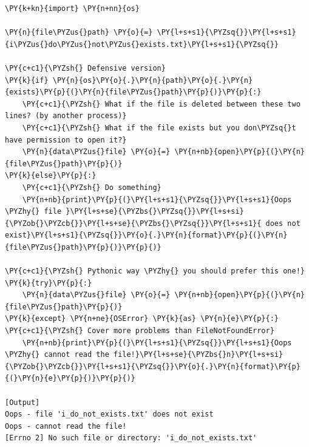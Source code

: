 \begin{Verbatim}[label=\makebox{\url{https://github.com/lucabaldini/cmepda/tree/master/slides/latex/snippets/dont\_ask\_permission.py}},commandchars=\\\{\}]
\PY{k+kn}{import} \PY{n+nn}{os}

\PY{n}{file\PYZus{}path} \PY{o}{=} \PY{l+s+s1}{\PYZsq{}}\PY{l+s+s1}{i\PYZus{}do\PYZus{}not\PYZus{}exists.txt}\PY{l+s+s1}{\PYZsq{}}

\PY{c+c1}{\PYZsh{} Defensive version}
\PY{k}{if} \PY{n}{os}\PY{o}{.}\PY{n}{path}\PY{o}{.}\PY{n}{exists}\PY{p}{(}\PY{n}{file\PYZus{}path}\PY{p}{)}\PY{p}{:}
    \PY{c+c1}{\PYZsh{} What if the file is deleted between these two lines? (by another process)}
    \PY{c+c1}{\PYZsh{} What if the file exists but you don\PYZsq{}t have permission to open it?}
    \PY{n}{data\PYZus{}file} \PY{o}{=} \PY{n+nb}{open}\PY{p}{(}\PY{n}{file\PYZus{}path}\PY{p}{)} 
\PY{k}{else}\PY{p}{:}
    \PY{c+c1}{\PYZsh{} Do something}
    \PY{n+nb}{print}\PY{p}{(}\PY{l+s+s1}{\PYZsq{}}\PY{l+s+s1}{Oops \PYZhy{} file }\PY{l+s+se}{\PYZbs{}\PYZsq{}}\PY{l+s+si}{\PYZob{}\PYZcb{}}\PY{l+s+se}{\PYZbs{}\PYZsq{}}\PY{l+s+s1}{ does not exist}\PY{l+s+s1}{\PYZsq{}}\PY{o}{.}\PY{n}{format}\PY{p}{(}\PY{n}{file\PYZus{}path}\PY{p}{)}\PY{p}{)}

\PY{c+c1}{\PYZsh{} Pythonic way \PYZhy{} you should prefer this one!}
\PY{k}{try}\PY{p}{:}
    \PY{n}{data\PYZus{}file} \PY{o}{=} \PY{n+nb}{open}\PY{p}{(}\PY{n}{file\PYZus{}path}\PY{p}{)}
\PY{k}{except} \PY{n+ne}{OSError} \PY{k}{as} \PY{n}{e}\PY{p}{:} \PY{c+c1}{\PYZsh{} Cover more problems than FileNotFoundError}
    \PY{n+nb}{print}\PY{p}{(}\PY{l+s+s1}{\PYZsq{}}\PY{l+s+s1}{Oops \PYZhy{} cannot read the file!}\PY{l+s+se}{\PYZbs{}n}\PY{l+s+si}{\PYZob{}\PYZcb{}}\PY{l+s+s1}{\PYZsq{}}\PY{o}{.}\PY{n}{format}\PY{p}{(}\PY{n}{e}\PY{p}{)}\PY{p}{)}

[Output]
Oops - file 'i_do_not_exists.txt' does not exist
Oops - cannot read the file!
[Errno 2] No such file or directory: 'i_do_not_exists.txt'
\end{Verbatim}